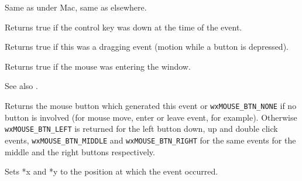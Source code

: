 
Same as  under Mac, same as 
 elsewhere.




\label{wxmouseeventcontroldown}


Returns true if the control key was down at the time of the event.


\label{wxmouseeventdragging}


Returns true if this was a dragging event (motion while a button is depressed).




\label{wxmouseevententering}


Returns true if the mouse was entering the window.

See also .


\label{wxmouseeventgetbutton}


Returns the mouse button which generated this event or {\tt wxMOUSE\_BTN\_NONE} 
if no button is involved (for mouse move, enter or leave event, for example).
Otherwise {\tt wxMOUSE\_BTN\_LEFT} is returned for the left button down, up and
double click events, {\tt wxMOUSE\_BTN\_MIDDLE} and {\tt wxMOUSE\_BTN\_RIGHT} 
for the same events for the middle and the right buttons respectively.


\label{wxmouseeventgetposition}




Sets *x and *y to the position at which the event occurred.


